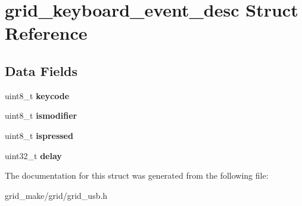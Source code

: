\hypertarget{structgrid__keyboard__event__desc}{\section{grid\-\_\-keyboard\-\_\-event\-\_\-desc Struct Reference}
\label{structgrid__keyboard__event__desc}
}
\subsection*{Data Fields}
\begin{DoxyCompactItemize}
\item 
\hypertarget{structgrid__keyboard__event__desc_a82abe66ecbd22244c96aa24b29fc8177}{uint8\-\_\-t {\bfseries keycode}}\label{structgrid__keyboard__event__desc_a82abe66ecbd22244c96aa24b29fc8177}

\item 
\hypertarget{structgrid__keyboard__event__desc_a5eb46e078ad0efacffa3b47ac8133f9a}{uint8\-\_\-t {\bfseries ismodifier}}\label{structgrid__keyboard__event__desc_a5eb46e078ad0efacffa3b47ac8133f9a}

\item 
\hypertarget{structgrid__keyboard__event__desc_ad0e6b8acc2020eb0ecdafa8204a00291}{uint8\-\_\-t {\bfseries ispressed}}\label{structgrid__keyboard__event__desc_ad0e6b8acc2020eb0ecdafa8204a00291}

\item 
\hypertarget{structgrid__keyboard__event__desc_abd1125652356e043f155a4d0347e26a9}{uint32\-\_\-t {\bfseries delay}}\label{structgrid__keyboard__event__desc_abd1125652356e043f155a4d0347e26a9}

\end{DoxyCompactItemize}


The documentation for this struct was generated from the following file\-:\begin{DoxyCompactItemize}
\item 
grid\-\_\-make/grid/grid\-\_\-usb.\-h\end{DoxyCompactItemize}
